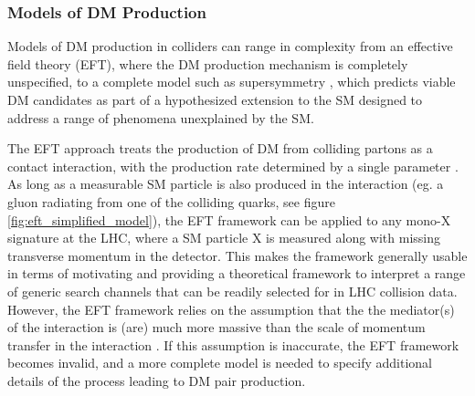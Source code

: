 \subsubsection{Models of DM Production}

Models of DM production in colliders can range in complexity from an effective field theory (EFT), where the DM production mechanism is completely unspecified, to a complete model such as supersymmetry \cite{susy_dm}, which predicts viable DM candidates as part of a hypothesized extension to the SM designed to address a range of phenomena unexplained by the SM. 

The EFT approach treats the production of DM from colliding partons as a contact interaction, with the production rate determined by a single parameter \cite{DM_colliders}. As long as a measurable SM particle is also produced in the interaction (eg. a gluon radiating from one of the colliding quarks, see figure \ref{fig:eft_simplified_model}), the EFT framework can be applied to any mono-X signature at the LHC, where a SM particle X is measured along with missing transverse momentum in the detector. This makes the framework generally usable in terms of motivating and providing a theoretical framework to interpret a range of generic search channels that can be readily selected for in LHC collision data. However, the EFT framework relies on the assumption that the the mediator(s) of the interaction is (are) much more massive than the scale of momentum transfer in the interaction \cite{DM_colliders, beyond_eft}. If this assumption is inaccurate, the EFT framework becomes invalid, and a more complete model is needed to specify additional details of the process leading to DM pair production. 


